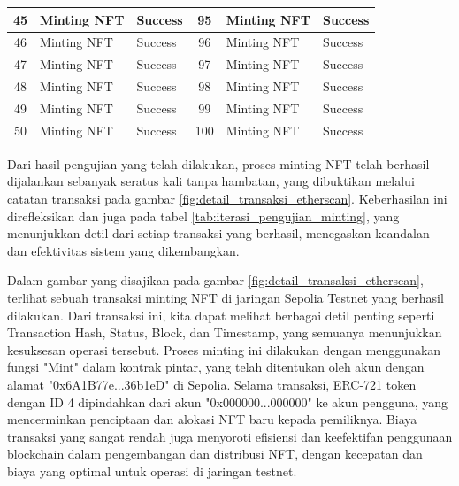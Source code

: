 \begin{longtable}[c]{|c|l|l||c|l|l|}
    45 & Minting NFT & Success & 95 & Minting NFT & Success \\ \hline
    46 & Minting NFT & Success & 96 & Minting NFT & Success \\ \hline
    47 & Minting NFT & Success & 97 & Minting NFT & Success \\ \hline
    48 & Minting NFT & Success & 98 & Minting NFT & Success \\ \hline
    49 & Minting NFT & Success & 99 & Minting NFT & Success \\ \hline
    50 & Minting NFT & Success & 100 & Minting NFT & Success \\ \hline
    \end{longtable}

  Dari hasil pengujian yang telah dilakukan, proses minting NFT telah berhasil dijalankan sebanyak seratus kali tanpa hambatan, yang dibuktikan melalui catatan transaksi pada gambar \ref*{fig:detail_transaksi_etherscan}. Keberhasilan ini direfleksikan dan juga pada tabel \ref{tab:iterasi_pengujian_minting}, yang menunjukkan detil dari setiap transaksi yang berhasil, menegaskan keandalan dan efektivitas sistem yang dikembangkan.

  Dalam gambar yang disajikan pada gambar \ref*{fig:detail_transaksi_etherscan}, terlihat sebuah transaksi minting NFT di jaringan Sepolia Testnet yang berhasil dilakukan. Dari transaksi ini, kita dapat melihat berbagai detil penting seperti Transaction Hash, Status, Block, dan Timestamp, yang semuanya menunjukkan kesuksesan operasi tersebut. Proses minting ini dilakukan dengan menggunakan fungsi "Mint" dalam kontrak pintar, yang telah ditentukan oleh akun dengan alamat "0x6A1B77e...36b1eD" di Sepolia. Selama transaksi, ERC-721 token dengan ID 4 dipindahkan dari akun "0x000000...000000" ke akun pengguna, yang mencerminkan penciptaan dan alokasi NFT baru kepada pemiliknya. Biaya transaksi yang sangat rendah juga menyoroti efisiensi dan keefektifan penggunaan blockchain dalam pengembangan dan distribusi NFT, dengan kecepatan dan biaya yang optimal untuk operasi di jaringan testnet.

